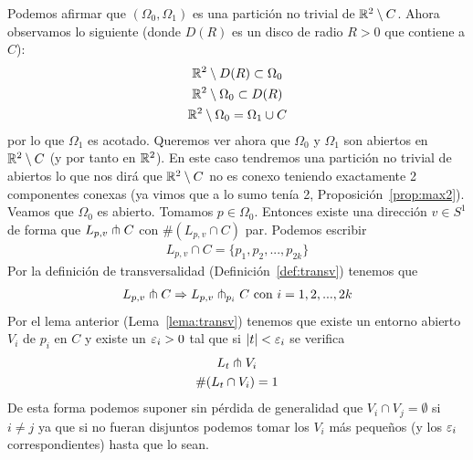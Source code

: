 Podemos afirmar que $(\Omega_0,\Omega_1)$ es una partición no trivial de $\mathbb{R}^2 \setminus C$. Ahora observamos lo siguiente (donde $D(R)$ es un disco de radio $R>0$ que contiene a $C$):
\begin{gather*}
    \mathbb{R}^2 \setminus D(R) \subset \Omega_0\\
    \mathbb{R}^2 \setminus \Omega_0 \subset D(R)\\
    \mathbb{R}^2 \setminus \Omega_0 = \Omega_1 \cup C
\end{gather*}
por lo que $\Omega_1$ es acotado. Queremos ver ahora que $\Omega_0$ y $\Omega_1$ son abiertos en $\mathbb{R}^2 \setminus C$ (y por tanto en $\mathbb{R}^2$). En este caso tendremos una partición no trivial de abiertos lo que nos dirá que $\mathbb{R}^2 \setminus C$ no es conexo teniendo exactamente 2 componentes conexas (ya vimos que a lo sumo tenía 2, Proposición~\ref{prop:max2}).\\

Veamos que $\Omega_0$ es abierto. Tomamos $p\in \Omega_0$. Entonces existe una dirección $v\in S^1$ de forma que $L_{p,v} \pitchfork C$ con $\#(L_{p,v} \cap C)$ par. Podemos escribir
\begin{gather*}
    L_{p,v}\cap C = \{p_1,p_2,...,p_{2k}\}
\end{gather*}
Por la definición de transversalidad (Definición~\ref{def:transv}) tenemos que 
\begin{gather*}
    L_{p,v}\pitchfork C \Rightarrow L_{p,v}\pitchfork _{p_i} C \text{ con } i=1,2,...,2k
\end{gather*}
Por el lema anterior (Lema~\ref{lema:transv}) tenemos que existe un entorno abierto $V_i$ de $p_i$ en $C$ y existe un $\varepsilon_i>0$ tal que si $|t|< \varepsilon_i$ se verifica
\begin{gather*}
    L_t\pitchfork V_i\\
    \#(L_t \cap V_i) = 1
\end{gather*}
De esta forma podemos suponer sin pérdida de generalidad que $V_i\cap V_j= \emptyset$ si $i\neq j$ ya que si no fueran disjuntos podemos tomar los $V_i$ más pequeños (y los $\varepsilon_i$ correspondientes) hasta que lo sean.\\


